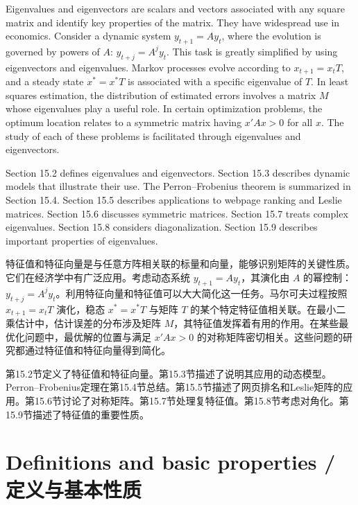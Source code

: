 \begin{original}
Eigenvalues and eigenvectors are scalars and vectors associated with any square matrix and identify key properties of the matrix. They have widespread use in economics. Consider a dynamic system $y_{t+1} = A y_t$, where the evolution is governed by powers of $A$: $y_{t+j} = A^j y_t$. This task is greatly simplified by using eigenvectors and eigenvalues. Markov processes evolve according to $x_{t+1} = x_t T$, and a steady state $x^* = x^* T$ is associated with a specific eigenvalue of $T$. In least squares estimation, the distribution of estimated errors involves a matrix $M$ whose eigenvalues play a useful role. In certain optimization problems, the optimum location relates to a symmetric matrix having $x'Ax > 0$ for all $x$. The study of each of these problems is facilitated through eigenvalues and eigenvectors.

Section 15.2 defines eigenvalues and eigenvectors. Section 15.3 describes dynamic models that illustrate their use. The Perron--Frobenius theorem is summarized in Section 15.4. Section 15.5 describes applications to webpage ranking and Leslie matrices. Section 15.6 discusses symmetric matrices. Section 15.7 treats complex eigenvalues. Section 15.8 considers diagonalization. Section 15.9 describes important properties of eigenvalues.
\end{original}
\begin{translation}
特征值和特征向量是与任意方阵相关联的标量和向量，能够识别矩阵的关键性质。它们在经济学中有广泛应用。考虑动态系统 $y_{t+1} = A y_t$，其演化由 $A$ 的幂控制：$y_{t+j} = A^j y_t$。利用特征向量和特征值可以大大简化这一任务。马尔可夫过程按照 $x_{t+1} = x_t T$ 演化，稳态 $x^* = x^* T$ 与矩阵 $T$ 的某个特定特征值相关联。在最小二乘估计中，估计误差的分布涉及矩阵 $M$，其特征值发挥着有用的作用。在某些最优化问题中，最优解的位置与满足 $x'Ax > 0$ 的对称矩阵密切相关。这些问题的研究都通过特征值和特征向量得到简化。

第15.2节定义了特征值和特征向量。第15.3节描述了说明其应用的动态模型。Perron--Frobenius定理在第15.4节总结。第15.5节描述了网页排名和Leslie矩阵的应用。第15.6节讨论了对称矩阵。第15.7节处理复特征值。第15.8节考虑对角化。第15.9节描述了特征值的重要性质。
\end{translation}

\section{Definitions and basic properties / 定义与基本性质}

